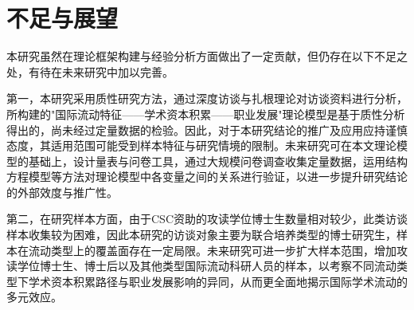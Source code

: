 \section{不足与展望}

本研究虽然在理论框架构建与经验分析方面做出了一定贡献，但仍存在以下不足之处，有待在未来研究中加以完善。

第一，本研究采用质性研究方法，通过深度访谈与扎根理论对访谈资料进行分析，所构建的"国际流动特征——学术资本积累——职业发展"理论模型是基于质性分析得出的，尚未经过定量数据的检验。因此，对于本研究结论的推广及应用应持谨慎态度，其适用范围可能受到样本特征与研究情境的限制。未来研究可在本文理论模型的基础上，设计量表与问卷工具，通过大规模问卷调查收集定量数据，运用结构方程模型等方法对理论模型中各变量之间的关系进行验证，以进一步提升研究结论的外部效度与推广性。

第二，在研究样本方面，由于CSC资助的攻读学位博士生数量相对较少，此类访谈样本收集较为困难，因此本研究的访谈对象主要为联合培养类型的博士研究生，样本在流动类型上的覆盖面存在一定局限。未来研究可进一步扩大样本范围，增加攻读学位博士生、博士后以及其他类型国际流动科研人员的样本，以考察不同流动类型下学术资本积累路径与职业发展影响的异同，从而更全面地揭示国际学术流动的多元效应。
